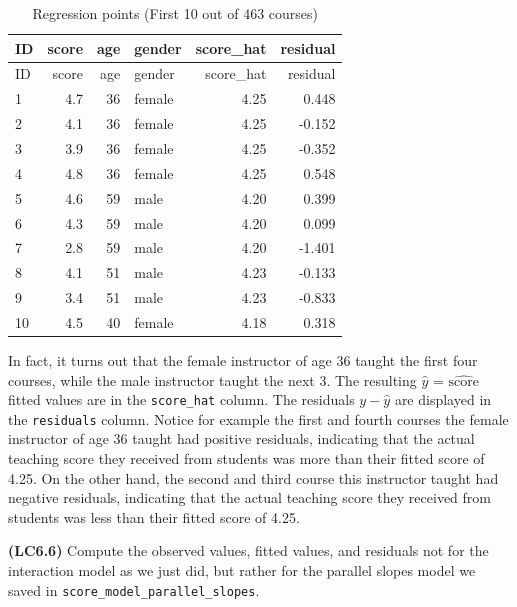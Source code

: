 \documentclass[
  letterpaper,
  DIV=11,
  numbers=noendperiod]{scrreprt}
\theoremstyle{definition}
\theoremstyle{remark}
\begin{document}
\hypertarget{tbl-model4-points-table}{}
\begin{longtable}[]{@{}lrrlrr@{}}
\caption{\label{tbl-model4-points-table}Regression points (First 10 out
of 463 courses)}\tabularnewline
\toprule()
ID & score & age & gender & score\_hat & residual \\
\midrule()
\endfirsthead
\toprule()
ID & score & age & gender & score\_hat & residual \\
\midrule()
\endhead
1 & 4.7 & 36 & female & 4.25 & 0.448 \\
2 & 4.1 & 36 & female & 4.25 & -0.152 \\
3 & 3.9 & 36 & female & 4.25 & -0.352 \\
4 & 4.8 & 36 & female & 4.25 & 0.548 \\
5 & 4.6 & 59 & male & 4.20 & 0.399 \\
6 & 4.3 & 59 & male & 4.20 & 0.099 \\
7 & 2.8 & 59 & male & 4.20 & -1.401 \\
8 & 4.1 & 51 & male & 4.23 & -0.133 \\
9 & 3.4 & 51 & male & 4.23 & -0.833 \\
10 & 4.5 & 40 & female & 4.18 & 0.318 \\
\bottomrule()
\end{longtable}

In fact, it turns out that the female instructor of age 36 taught the
first four courses, while the male instructor taught the next 3. The
resulting \(\widehat{y}\) = \(\widehat{\text{score}}\) fitted values are
in the \texttt{score\_hat} column. The residuals \(y-\widehat{y}\) are
displayed in the \texttt{residuals} column. Notice for example the first
and fourth courses the female instructor of age 36 taught had positive
residuals, indicating that the actual teaching score they received from
students was more than their fitted score of 4.25. On the other hand,
the second and third course this instructor taught had negative
residuals, indicating that the actual teaching score they received from
students was less than their fitted score of 4.25.

\begin{tcolorbox}[enhanced jigsaw, coltitle=black, toprule=.15mm, bottomtitle=1mm, breakable, leftrule=.75mm, title={{🎯} Learning Check 6.5}, opacitybacktitle=0.6, colback=white, rightrule=.15mm, opacityback=0, toptitle=1mm, colbacktitle=quarto-callout-tip-color!10!white, colframe=quarto-callout-tip-color-frame, titlerule=0mm, arc=.35mm, bottomrule=.15mm, left=2mm]
\textbf{(LC6.6)} Compute the observed values, fitted values, and
residuals not for the interaction model as we just did, but rather for
the parallel slopes model we saved in
\texttt{score\_model\_parallel\_slopes}.
\end{tcolorbox}
\end{document}
